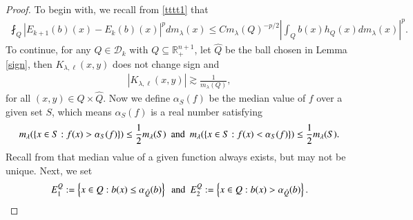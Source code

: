 \documentclass[12pt]{amsart}
\begin{document}
\begin{proof}
To begin with, we recall from \eqref{tttt1} that
\begin{align}\label{comcom1}
\fint_{Q}|E_{k+1}(b)(x)-E_{k}(b)(x)|^{p}dm_\lambda(x)\leq Cm_\lambda(Q)^{-p/2}\left|\int_{Q}b(x)h_{Q}(x)dm_\lambda(x)\right|^{p}.
\end{align}
To continue, for any $Q\in\mathcal{D}_{k}$ with $Q\subseteq \mathbb{R}^{n+1}_+$, let $\hat{Q}$ be the ball chosen in Lemma \ref{sign}, then $K_{\lambda,\ell}(x,y)$ does not change sign and
\begin{align}\label{lower}
|K_{\lambda,\ell}(x,y)|\gtrsim\frac{1}{m_\lambda(Q)},
\end{align}
for all $(x,y)\in Q\times \hat{Q}$.
Now we define $\alpha_{S}(f)$ be the median value of $f$ over a given set $S$, which means $\alpha_{S}(f)$ is a real number satisfying
\begin{align*}
m_\lambda(\left\{x\in S:f(x)>\alpha_{S}(f)\right\})\leq\frac{1}{2}m_\lambda(S)\ \ {\rm and}\ \ m_\lambda(\left\{x\in S:f(x)<\alpha_{S}(f)\right\})\leq\frac{1}{2}m_\lambda(S).
\end{align*}
Recall from \cite{Journe} that median value of a given function always exists, but  may not be unique. Next, we set
\begin{align}\label{e:E1S}
E_{1}^{Q}:=\left\{x\in Q:b(x)\leq\alpha_{\hat{Q}}(b)\right\}\ \ {\rm and}\ \
E_{2}^{Q}:=\left\{x\in Q:b(x)>\alpha_{\hat{Q}}(b)\right\}.
\end{align}





\end{proof}
\end{document}
